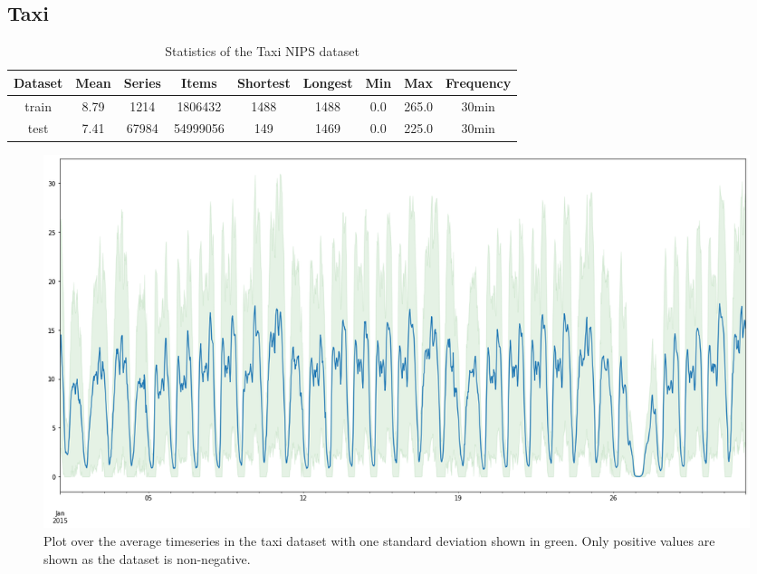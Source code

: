 \clearpage
\subsection{Taxi}
\begin{table}[htb]
    \begin{tabular}{||c | c c c c c c c c ||}
        \hline
        Dataset & Mean & Series & Items    & Shortest & Longest & Min & Max   & Frequency \\ [0.5ex]
        \hline\hline
        train   & 8.79 & 1214   & 1806432  & 1488     & 1488    & 0.0 & 265.0 & 30min     \\
        \hline
        test    & 7.41 & 67984  & 54999056 & 149      & 1469    & 0.0 & 225.0 & 30min     \\
        \hline
    \end{tabular}
    \caption{Statistics of the Taxi NIPS dataset}
\end{table}

\begin{figure}[htb]
    \centering
    \includegraphics[width=\linewidth]{./img/taxi_30min_plot.png}
    \caption{Plot over the average timeseries in the taxi dataset with one standard deviation shown in green. Only positive values are shown as the dataset is non-negative.}
    \label{fig:taxi_30min_plot}
    \endminipage\hfill
\end{figure}

